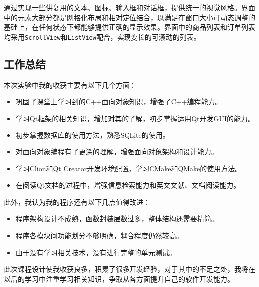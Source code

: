 \documentclass[lang=cn,11pt,a4paper,cite=authornum]{paper}
\begin{document}
通过实现一些供复用的文本、图标、输入框和对话框，提供统一的视觉风格。界面中的元素大部分都是网格化布局和相对定位结合，以满足在窗口大小可动态调整的基础上，在任何状态下都能够提供正确的显示效果。界面中的商品列表和订单列表均采用\texttt{ScrollView}和\texttt{ListView}配合，实现变长的可滚动的列表。

\subsection{工作总结}

本次实验中我的收获主要有以下几个方面：

\begin{itemize}
    \item 巩固了课堂上学习到的C++面向对象知识，增强了C++编程能力。
    \item 学习Qt框架的相关知识，增加对其的了解，初步掌握运用Qt开发GUI的能力。
    \item 初步掌握数据库的使用方法，熟悉SQLite的使用。
    \item 对面向对象编程有了更深的理解，增强面向对象架构和设计能力。
    \item 学习Clion和Qt Creator开发环境配置，学习CMake和QMake的使用方法。
    \item 在阅读Qt文档的过程中，增强信息检索能力和英文文献、文档阅读能力。
\end{itemize}

此外，我认为我的程序还有以下几点值得改进：

\begin{itemize}
    \item 程序架构设计不成熟，函数封装层数过多，整体结构还需要精简。
    \item 程序各模块间功能划分不够明确，耦合程度仍然较高。
    \item 由于没有学习相关技术，没有进行完整的单元测试。
\end{itemize}

此次课程设计使我收获良多，积累了很多开发经验，对于其中的不足之处，我将在以后的学习中注重学习相关知识，争取从各方面提升自己的软件开发能力。
\end{document}
